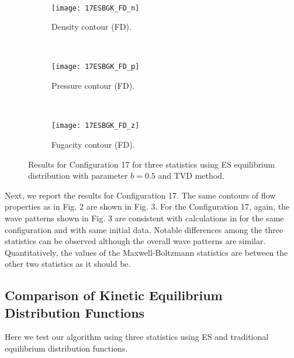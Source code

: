 \documentclass{rsproca}%
\begin{document}
\begin{figure}
\begin{subfigure}[b]{0.32\textwidth}
        \end{subfigure}
        ~ %
        \begin{subfigure}[b]{0.32\textwidth}
                \centering
                \texttt{[image: 17ESBGK\_FD\_n]}
                \caption{Density contour (FD).}
                \label{fig:17ESBGK_FD_n}
        \end{subfigure}
        ~ %
        \begin{subfigure}[b]{0.32\textwidth}
                \centering
                \texttt{[image: 17ESBGK\_FD\_p]}
                \caption{Pressure contour (FD).}
                \label{fig:17ESBGK_FD_p}
        \end{subfigure}
				~ %
        \begin{subfigure}[b]{0.32\textwidth}
                \centering
                \texttt{[image: 17ESBGK\_FD\_z]}
                \caption{Fugacity contour (FD).}
                \label{fig:17ESBGK_FD_z}
        \end{subfigure}
				\caption{Results for Configuration 17 for three statistics using ES equilibrium distribution with parameter $b=0.5$ and TVD method.} \label{fig:test_configuration17}
\end{figure}
Next, we report the results for Configuration 17.  The same contours of flow properties as in Fig. 2 are shown in Fig. 3.
For the Configuration 17, again, the wave patterns shown in Fig. 3 are consistent with calculations in \cite{Laxliu95}\cite{schultzrinne} for the same configuration and with same initial data.   Notable differences among the three statistics can be observed although the overall wave patterns are similar.  Quantitatively, the values of the Maxwell-Boltzmann statistics are between the other two statistics as it should be.

\subsection{Comparison of Kinetic Equilibrium Distribution Functions}
Here we test our algorithm using three statistics using ES and traditional equilibrium distribution functions.
\end{document}

